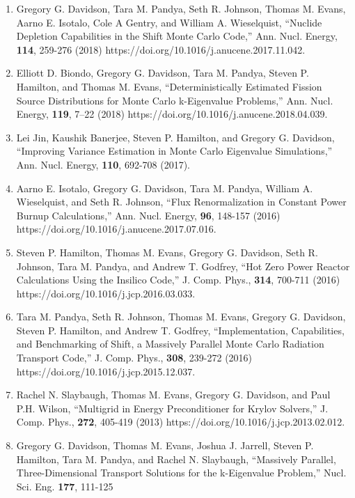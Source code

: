 \documentclass[letterpaper,11pt]{article}
\begin{document}
\begin{enumerate}
  \item Gregory G. Davidson, Tara M. Pandya, Seth R. Johnson, Thomas
    M. Evans, Aarno E. Isotalo, Cole A Gentry, and William
    A. Wieselquist, ``Nuclide Depletion Capabilities in the Shift Monte
    Carlo Code,'' Ann. Nucl. Energy, \textbf{114}, 259-276 (2018)
    https://doi.org/10.1016/j.anucene.2017.11.042.
  \item Elliott D. Biondo, Gregory G. Davidson, Tara M. Pandya,
    Steven P. Hamilton, and Thomas M. Evans, ``Deterministically
    Estimated Fission Source Distributions for Monte Carlo
    k-Eigenvalue Problems,'' Ann. Nucl. Energy, \textbf{119}, 7--22
    (2018) https://doi.org/10.1016/j.anucene.2018.04.039.
  \item Lei Jin, Kaushik Banerjee, Steven P. Hamilton, and Gregory
    G. Davidson, ``Improving Variance Estimation in Monte Carlo
    Eigenvalue Simulations,'' Ann. Nucl. Energy, \textbf{110}, 692-708
    (2017). 
  \item Aarno E. Isotalo, Gregory G. Davidson, Tara M. Pandya, William
    A. Wieselquist, and Seth R. Johnson, ``Flux Renormalization in
    Constant Power Burnup Calculations,'' Ann. Nucl. Energy,
    \textbf{96}, 148-157 (2016)
    https://doi.org/10.1016/j.anucene.2017.07.016.
  \item Steven P. Hamilton, Thomas M. Evans, Gregory G. Davidson, Seth
    R. Johnson, Tara M. Pandya, and Andrew T. Godfrey, ``Hot Zero
    Power Reactor Calculations Using the Insilico Code,''
    J. Comp. Phys., \textbf{314}, 700-711 (2016)
    https://doi.org/10.1016/j.jcp.2016.03.033.
  \item Tara M. Pandya, Seth R. Johnson, Thomas M. Evans, Gregory
    G. Davidson, Steven P. Hamilton, and Andrew T. Godfrey,
    ``Implementation, Capabilities, and Benchmarking of Shift, a
    Massively Parallel Monte Carlo Radiation Transport Code,''
    J. Comp. Phys., \textbf{308}, 239-272 (2016)
    https://doi.org/10.1016/j.jcp.2015.12.037.
  \item Rachel N. Slaybaugh, Thomas M. Evans, Gregory G. Davidson, and
    Paul P.H. Wilson, ``Multigrid in Energy Preconditioner for Krylov
    Solvers,'' J. Comp. Phys., \textbf{272}, 405-419 (2013)
    https://doi.org/10.1016/j.jcp.2013.02.012.
  \item Gregory G. Davidson, Thomas M. Evans, Joshua J. Jarrell,
    Steven P. Hamilton, Tara M. Pandya, and Rachel N. Slaybaugh, ``Massively
    Parallel, Three-Dimensional Transport Solutions for the
    k-Eigenvalue Problem,'' Nucl. Sci. Eng. \textbf{177}, 111-125

\end{enumerate}
\end{document}
